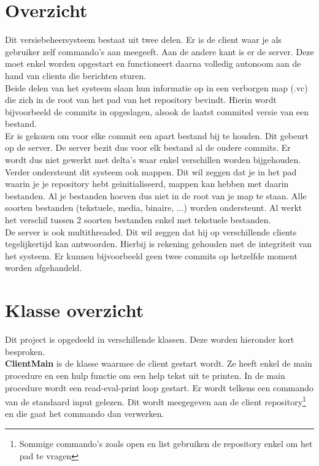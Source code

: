 \documentclass{article}
\begin{document}
\section{Overzicht}
\label{sec:overzicht}
Dit versiebeheersysteem bestaat uit twee delen. Er is de client waar je als gebruiker zelf commando's aan meegeeft. Aan de andere kant is er de server. Deze moet enkel worden opgestart en functioneert daarna volledig autonoom aan de hand van clients die berichten sturen.\\
Beide delen van het systeem slaan hun informatie op in een verborgen map (.vc) die zich in de root van het pad van het repository bevindt. Hierin wordt bijvoorbeeld de commits in opgeslagen, alsook de laatst commited versie van een bestand.\\
Er is gekozen om voor elke commit een apart bestand bij te houden. Dit gebeurt op de server. De server bezit dus voor elk bestand al de oudere commits. Er wordt dus niet gewerkt met delta's waar enkel verschillen worden bijgehouden.\\
Verder ondersteunt dit systeem ook mappen. Dit wil zeggen dat je in het pad waarin je je repository hebt ge\"{i}nitialiseerd, mappen kan hebben met daarin bestanden. Al je bestanden hoeven dus niet in de root van je map te staan. Alle soorten bestanden (tekstuele, media, binaire, ...) worden ondersteunt. Al werkt het verschil tussen 2 soorten bestanden enkel met tekstuele bestanden.\\
De server is ook multithreaded. Dit wil zeggen dat hij op verschillende clients tegelijkertijd kan antwoorden. Hierbij is rekening gehouden met de integriteit van het systeem. Er kunnen bijvoorbeeld geen twee commits op hetzelfde moment worden afgehandeld.\\

\section{Klasse overzicht}
\label{sec:klasoverzicht}
Dit project is opgedeeld in verschillende klassen. Deze worden hieronder kort besproken.\\

\textbf{ClientMain} is de klasse waarmee de client gestart wordt. Ze heeft enkel de main procedure en een hulp functie om een help tekst uit te printen. In de main procedure wordt een read-eval-print loop gestart. Er wordt telkens een commando van de standaard input gelezen. Dit wordt meegegeven aan de client repository\footnote{Sommige commando's zoals open en list gebruiken de repository enkel om het pad te vragen} en die gaat het commando dan verwerken.\\
\end{document}
